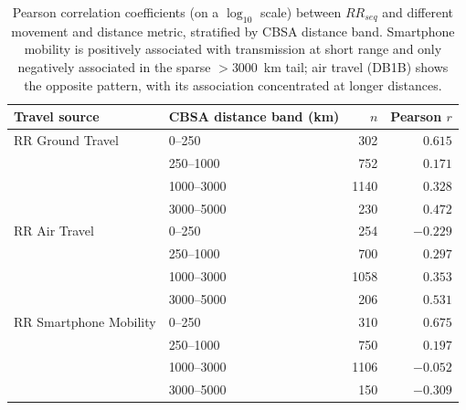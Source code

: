 \documentclass[11pt, letterpaper, oneside]{article}
\begin{document}
\begin{table}[]
    \centering
    \caption{Pearson correlation coefficients (on a $\log_{10}$ scale) between $RR_{seq}$ and different movement and distance metric, stratified by CBSA distance band.
    Smartphone mobility is positively associated with transmission at short range and only negatively associated in the sparse $>3000$~km tail; air travel (DB1B) shows the opposite pattern, with its association concentrated at longer distances.}
    \label{tab:band_corr}
    \begin{tabular}{llrr}
        \toprule
        Travel source & CBSA distance band (km) & $n$ & Pearson $r$ \\
        \midrule
        RR Ground Travel       & 0--250      & 302  & $0.615$ \\
                               & 250--1000   & 752  & $0.171$ \\
                               & 1000--3000  & 1140 & $0.328$ \\
                               & 3000--5000  & 230  & $0.472$ \\
        \addlinespace
        RR Air Travel          & 0--250      & 254  & $-0.229$ \\
                               & 250--1000   & 700  & $0.297$ \\
                               & 1000--3000  & 1058 & $0.353$ \\
                               & 3000--5000  & 206  & $0.531$ \\
        \addlinespace
        RR Smartphone Mobility & 0--250      & 310  & $0.675$ \\
                               & 250--1000   & 750  & $0.197$ \\
                               & 1000--3000  & 1106 & $-0.052$ \\
                               & 3000--5000  & 150  & $-0.309$ \\
        \bottomrule
    \end{tabular}
\end{table}
\end{document}

